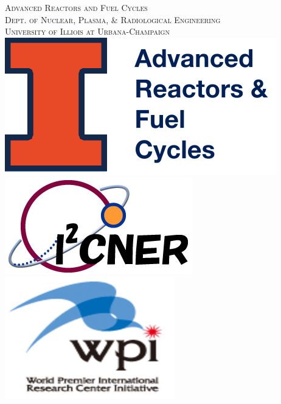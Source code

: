 \documentclass[14pt,a4paper]{article} %
\begin{document}
\begin{titlepage}
    \textsc{\LARGE Advanced Reactors and Fuel Cycles}\\[0.25cm] %
    
    \textsc{\large Dept. of Nuclear, Plasma, \& Radiological Engineering}\\%
    
    \textsc{\large University of Illiois at Urbana-Champaign}\\ %


    
    
    
    \vspace{0.5cm}
    \includegraphics[scale=0.2]{arfc-smol}
    \includegraphics[scale=0.3]{i2cner-logo}
    \includegraphics[scale=0.2]{wpi-logo}

\end{titlepage}
\end{document}
